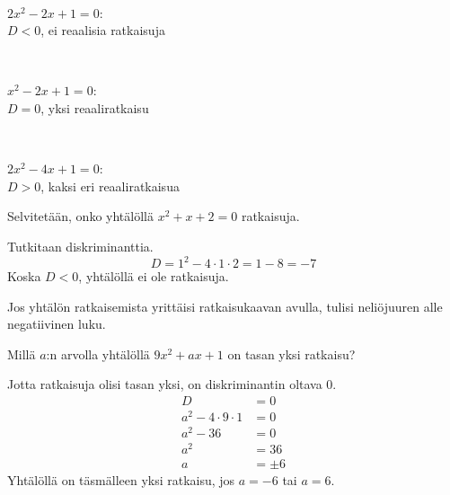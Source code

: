 \begin{esimerkki}
\ \\
\parbox{4.5cm}{
\begin{kuvaajapohja}{1}{-1}{3}{-1}{3}
\end{kuvaajapohja}
}
\parbox{6cm}{$2x^2-2x+1=0$:\\$D < 0$, ei reaalisia ratkaisuja}
\\
\parbox{4.5cm}{
\begin{kuvaajapohja}{1}{-1}{3}{-1}{3}
\end{kuvaajapohja}
}
\parbox{6cm}{$x^2-2x+1=0$:\\$D = 0$, yksi reaaliratkaisu}
\\
\parbox{4.5cm}{
\begin{kuvaajapohja}{1}{-1}{3}{-2}{2}
\end{kuvaajapohja}
}
\parbox{6cm}{$2x^2-4x+1=0$:\\$D > 0$, kaksi eri reaaliratkaisua}
\end{esimerkki}

\begin{esimerkki}
Selvitetään, onko yhtälöllä $x^2+x+2=0$ ratkaisuja.

Tutkitaan diskriminanttia.
\[D=1^2-4\cdot 1 \cdot 2 = 1-8 = -7\]
Koska $D<0$, yhtälöllä ei ole ratkaisuja.

Jos yhtälön ratkaisemista yrittäisi ratkaisukaavan avulla, tulisi
neliöjuuren alle negatiivinen luku.
\end{esimerkki}

\begin{esimerkki}
Millä $a$:n arvolla yhtälöllä $9x^2+ax+1$ on tasan yksi ratkaisu?

Jotta ratkaisuja olisi tasan yksi, on diskriminantin oltava 0.
\begin{align*}
D &= 0\\
a^2-4\cdot 9\cdot 1 &= 0\\
a^2-36 &= 0\\
a^2 &= 36\\
a &= \pm 6
\end{align*}
Yhtälöllä on täsmälleen yksi ratkaisu, jos $a=-6$ tai $a=6$.
\end{esimerkki}

